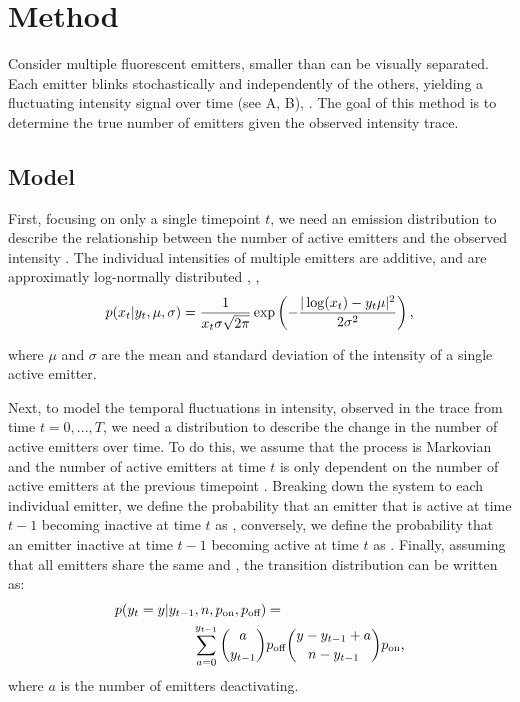 \section{Method}

Consider multiple fluorescent emitters, 
smaller than can be visually separated. Each emitter blinks stochastically and independently of the others, yielding a fluctuating intensity signal over time (see  A, B), .
The goal of this method is to determine the true number of emitters \truen given the observed intensity trace.

\subsection{Model}

First, focusing on only a single timepoint $t$, we need an emission distribution to describe the relationship between the number of active emitters  and the observed intensity . The individual intensities of multiple emitters are additive, and are approximatly log-normally distributed \cite{mutch_deconvolving_2007}, \ie,
%
\begin{equation*}
  p(x_{t}|y_{t}, \mu, \sigma) =
    \frac{1}{x_{t}\sigma\sqrt{2\pi}}
    \exp \left(
      - \frac{|\log(x_{t}) - y_{t}\mu|^2}{2\sigma^2}
    \right)
  \text{,}
\end{equation*}

where $\mu$ and $\sigma$ are the mean and standard deviation of the intensity of a single active emitter.

Next, to model the temporal fluctuations in intensity, observed in the trace \trace from time $t=0,...,T$, we need a distribution to describe the change in the number of active emitters \states over time. To do this, we assume that the process is Markovian and the number of active emitters  at time $t$ is only dependent on the number of active emitters at the previous timepoint . Breaking down the system to each individual emitter, we define the probability that an emitter that is active at time $t-1$ becoming inactive at time $t$ as \poff, conversely, we define the probability that an emitter inactive at time $t-1$ becoming active at time $t$ as \pon. Finally, assuming that all emitters share the same \poff and \pon, the transition distribution can be written as:
%
\begin{align*}
  p(\y{t} = y | \y{t-1}, \n, \pon, \poff) &=\\
	\sum_{a = 0}^{\y{t-1}}
    {a \choose \y{t-1}}
    &\poff
    {y - \y{t-1} + a \choose \n - \y{t-1}}
    \pon
    \text{,}
\end{align*}
%
where $a$ is the number of emitters deactivating. 

